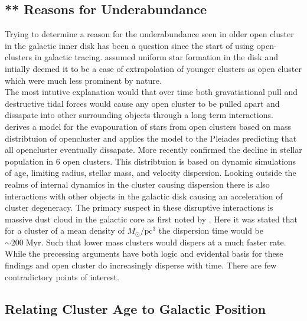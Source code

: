 \subsection{** Reasons for Underabundance} \label{sec:rea4abunda}

Trying to determine a reason for the underabundance seen in older open cluster in the galactic inner disk has been a question since the start of using open-clusters in galactic tracing. \cite{1950BAN....11...91O} assumed uniform star formation in the disk and intially deemed it to be a case of extrapolation of younger clusters as open cluster which were much less prominent by nature. \\ The most intutive explanation would that over time both gravatiational pull and destructive tidal forces would cause any open cluster to be pulled apart and dissapate into other surrounding objects through a long term interactions. \\ \cite{1973SvA....16..837K} derives a model for the evapouration of stars from open clusters based on mass distribtuion of opencluster and applies the model to the Pleiades predicting that all opencluster eventually dissapate. More recently \cite{2019A&A...624A...8A} confirmed the decline in stellar population in 6 open clusters. This distribtuion is based on dynamic simulations of age, limiting radius, stellar mass, and velocity dispersion. Looking outside the realms of internal dynamics in the cluster causing dispersion there is also interactions with other objects in the galactic disk causing an acceleration of cluster degeneracy. The primary suspect in these disruptive interactions is massive dust cloud in the galactic core as first noted by \cite{1958ApJ...127...17S}. Here it was stated that for a cluster of a mean density of $M_\odot/\text{pc}^3$ the dispersion time would be $\sim 200 \; \text{Myr}$. Such that lower mass clusters would dispers at a much faster rate. \\ 
While the precessing arguments have both logic and evidental basis for these findings and open cluster do increasingly disperse with time. There are few contradictory points of interest. 

\subsection{Relating Cluster Age to Galactic Position}

